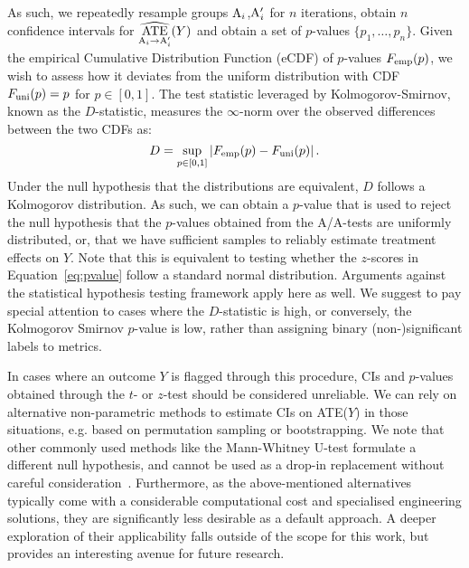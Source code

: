 As such, we repeatedly resample groups ${\rm A}_{i}$,${\rm A}_{i}^\prime$ for $n$ iterations, obtain $n$ confidence intervals for $\widehat{\mathop{\rm ATE}\limits_{{\rm A}_i \to {\rm A}_{i}^{\prime}}}(Y)$ and obtain a set of $p$-values $\{p_{1},\ldots,p_{n}\}$.
Given the empirical Cumulative Distribution Function (eCDF) of $p$-values $F_{\rm emp}(p)$, we wish to assess how it deviates from the uniform distribution with CDF $F_{\rm uni}(p)=p$ for $p\in[0,1]$.
The test statistic leveraged by Kolmogorov-Smirnov, known as the $D$-statistic, measures the $\infty$-norm over the observed differences between the two CDFs as:
\begin{equation}
    D = \sup_{p\in[0,1]} \left|F_{\rm emp}(p) - F_{\rm uni}(p)\right|.
\end{equation}
Under the null hypothesis that the distributions are equivalent, $D$ follows a Kolmogorov distribution.
As such, we can obtain a $p$-value that is used to reject the null hypothesis that the $p$-values obtained from the A/A-tests are uniformly distributed, or, that we have sufficient samples to reliably estimate treatment effects on $Y$.
Note that this is equivalent to testing whether the $z$-scores in Equation~\ref{eq:pvalue} follow a standard normal distribution.
Arguments against the statistical hypothesis testing framework apply here as well.
We suggest to pay special attention to cases where the $D$-statistic is high, or conversely, the Kolmogorov Smirnov $p$-value is low, rather than assigning binary (non-)significant labels to metrics.

In cases where an outcome $Y$ is flagged through this procedure, CIs and $p$-values obtained through the $t$- or $z$-test should be considered unreliable.
We can rely on alternative non-parametric methods to estimate CIs on ATE($Y$) in those situations, e.g. based on permutation sampling or bootstrapping.
We note that other commonly used methods like the Mann-Whitney U-test formulate a different null hypothesis, and cannot be used as a drop-in replacement without careful consideration~\cite{Fay2010}.
Furthermore, as the above-mentioned alternatives typically come with a considerable computational cost and specialised engineering solutions, they are significantly less desirable as a default approach.
A deeper exploration of their applicability falls outside of the scope for this work, but provides an interesting avenue for future research.